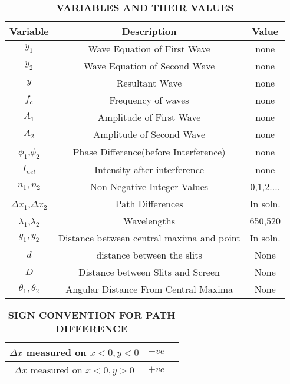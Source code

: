 \documentclass[journal,12pt,twocolumn]{IEEEtran}
\theoremstyle{remark}
\begin{document}
\begin{table}[h!]
\renewcommand\thetable{1}
    \centering
    \begin{tabular}{|c|c|c|}
    \hline
       \textbf{Variable}& \textbf{Description}& \textbf{Value}\\\hline
         $y_1$& Wave Equation of First Wave&none\\\hline
          $y_2$&Wave Equation of Second Wave &none\\\hline
         $y$&   Resultant Wave&none\\\hline
          $f_c$& Frequency of waves&none\\\hline
         $A_1$& Amplitude of First Wave&none\\\hline
         $A_2$& Amplitude of Second Wave&none\\\hline
         $\phi_1$,$\phi_2$& Phase Difference(before Interference)&none\\\hline
         $I_{net}$& Intensity after interference&none\\\hline
         $n_1,n_2$& Non Negative Integer Values&0,1,2....\\\hline
         $\Delta x_1$,$\Delta x_2$& Path Differences&In soln.\\\hline
         $\lambda_{1}$,$\lambda_2$& Wavelengths&650,520\\\hline
         $y_1,y_2$& Distance between central maxima and point&In soln.\\\hline
         $d$& distance between the slits&None\\\hline
         $D$& Distance between Slits and Screen&None\\\hline
         $\theta_1,\theta_2$& Angular Distance From Central Maxima&None\\\hline
    \end{tabular}
    \vspace{0.3cm}
    \caption{\textbf{VARIABLES AND THEIR VALUES}}
    \label{tab:my_label}
\end{table}
\begin{table}[h!]
\renewcommand\thetable{2}
    \centering
    \begin{tabular}{|c|c|c|}
    \hline
         $\Delta x$ measured on $x<0,y<0$&$ -ve $\\\hline
         $\Delta x$ measured on $x<0,y>0$&$ +ve $\\\hline 
    \end{tabular}
    \vspace{0.2cm}
    \caption{\textbf{SIGN CONVENTION FOR PATH DIFFERENCE}}
    \label{12.10.6.2}
\end{table}
\end{document}
